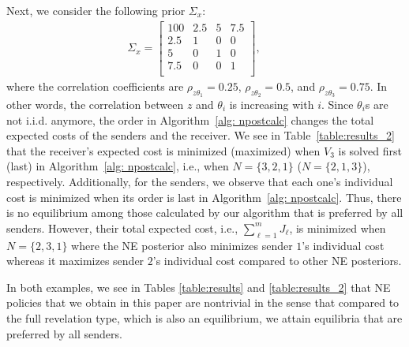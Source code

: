 \documentclass[12pt,journal,onecolumn]{IEEEtran}
\begin{document}
Next, we consider the following prior $\Sigma_x$:
\begin{align}\label{eqn:example_3}
\Sigma_x= \begin{bmatrix} 
    100 & 2.5 & 5 &7.5\\
    2.5 & 1 & 0 & 0\\
    5 & 0& 1&0  \\
    7.5 & 0 & 0 &1\\
    \end{bmatrix},
\qquad
\end{align}
where the correlation coefficients are $\rho_{z \theta_1} =0.25 $, $\rho_{z \theta_2} =0.5 $, and $\rho_{z \theta_3} =0.75 $. In other words, the correlation between $z$ and $\theta_i$ is increasing with $i$. Since $\theta_i$s are not i.i.d. anymore, the order in Algorithm~\ref{alg: npostcalc} changes the total expected costs of the senders and the receiver. We see in Table~\ref{table:results_2} that the receiver's expected cost is minimized (maximized) when $V_3$ is solved first (last) in Algorithm~\ref{alg: npostcalc}, i.e., when $N = \{3,2,1\}$ ($N = \{2,1,3\}$), respectively. Additionally, for the senders, we observe that each one's individual cost is minimized when its order is last in Algorithm~\ref{alg: npostcalc}. Thus, there is no equilibrium among those calculated by our algorithm that is preferred by all senders. However, their total expected cost, i.e., $\sum_{\ell= 1}^{m}J_{\ell}$, is minimized when $N= \{2,3,1\}$ where the NE posterior also minimizes sender $1$'s individual cost whereas it maximizes sender $2$'s individual cost compared to other NE posteriors.

In both examples, we see in Tables \ref{table:results} and \ref{table:results_2} that NE policies that we obtain in this paper are nontrivial in the sense that compared to the full revelation type, which is also an equilibrium, we attain equilibria that are preferred by all senders.
\end{document}
